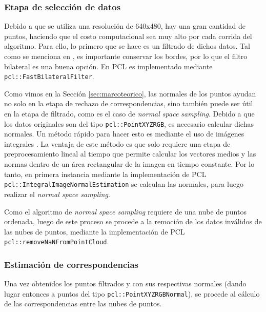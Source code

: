 \subsubsection{Etapa de selección de datos}
Debido a que se utiliza una resolución de 640x480, hay una gran cantidad de puntos, haciendo que el costo computacional sea muy alto por cada corrida del algoritmo. Para ello, lo primero que se hace es un filtrado de dichos datos. Tal como se menciona en \cite{holz2015}, es importante conservar los bordes, por lo que el filtro bilateral es una buena opción. En PCL es implementado mediante \lstinline{pcl::FastBilateralFilter}.

Como vimos en la Sección \ref{sec:marcoteorico}, las normales de los puntos ayudan no solo en la etapa de rechazo de correspondencias, sino también puede ser útil en la etapa de filtrado, como es el caso de \textit{normal space sampling}. Debido a que los datos originales son del tipo \lstinline{pcl::PointXYZRGB}, es necesario calcular dichas normales. Un método rápido para hacer esto es mediante el uso de imágenes integrales \cite{holzer2012}. La ventaja de este método es que solo requiere una etapa de preprocesamiento lineal al tiempo que permite calcular los vectores medios y las normas dentro de un área rectangular de la imagen en tiempo constante. Por lo tanto, en primera instancia mediante la implementación de PCL \lstinline{pcl::IntegralImageNormalEstimation} se calculan las normales, para luego realizar el \textit{normal space sampling}.

Como el algoritmo de \textit{normal space sampling} requiere de una nube de puntos ordenada, luego de este proceso se procede a la remoción de los datos inválidos de las nubes de puntos, mediante la implementación de PCL \lstinline{pcl::removeNaNFromPointCloud}.

\subsubsection{Estimación de correspondencias}
Una vez obtenidos los puntos filtrados y con sus respectivas normales (dando lugar entonces a puntos del tipo \lstinline{pcl::PointXYZRGBNormal}), se procede al cálculo de las correspondencias entre las nubes de puntos.

